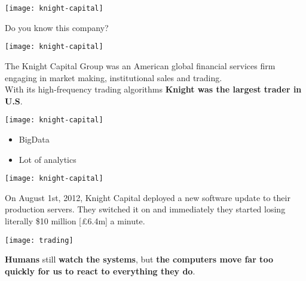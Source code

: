 \documentclass[aspectratio=169, 15pt,usenames,dvipsnames]{beamer}
\begin{document}
\begin{gdsw}
	\centering\texttt{[image: knight-capital]}
	\par\LARGE
	Do you know this company? 
\end{gdsw}
\begin{gdsw}
	\centering\texttt{[image: knight-capital]} 
	\par
	The Knight Capital Group was an American global financial services firm engaging in market making, institutional sales and trading.\\
	With its high-frequency trading algorithms {\bf Knight was the largest trader in U.S}.        
\end{gdsw}
\begin{gdsw}
	\centering\texttt{[image: knight-capital]} 
	\par
	\begin{center}\LARGE
		\begin{minipage}{.5\textwidth}
			\begin{itemize}
				\item BigData
				\item Lot of analytics
			\end{itemize}
		\end{minipage}
	\end{center}
\end{gdsw}
\begin{gdsw}
	\centering\texttt{[image: knight-capital]} 
	\par
	On August 1st, 2012, Knight Capital deployed a new software update to their production servers.
	They switched it on and immediately they started losing literally \$10 million [£6.4m] a minute.
\end{gdsw}	
\begin{gdsw}
	\centering\texttt{[image: trading]} 
	\par
	{\bf Humans} still {\bf watch the systems}, but {\bf the computers move far too quickly for us to react to everything they do}.\\
\end{gdsw}
\begin{gdsw}
\end{gdsw}
\end{document}
